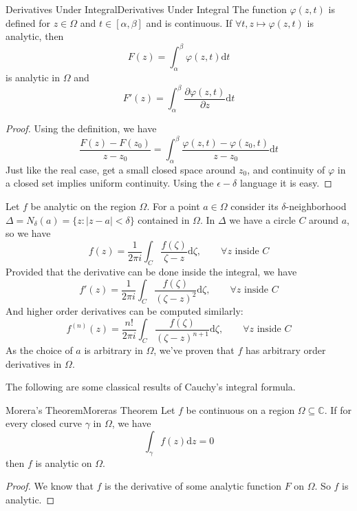 \documentclass[../main.tex]{subfiles}
\begin{document}
\begin{lemma}{Derivatives Under Integral}{Derivatives Under Integral}
	The function $\varphi(z,t)$ is defined for $z\in \Omega$ and $t\in [\alpha,\beta]$ and is continuous. If $\forall t, z \mapsto \varphi(z,t)$ is analytic, then
	\begin{equation}
	F(z) = \int_{\alpha}^{\beta} \varphi(z,t) \mathrm{d} t
	\end{equation}
	is analytic in $\Omega$ and
	\begin{equation}
	F'(z) = \int_{\alpha}^{\beta} \frac{\partial \varphi(z,t)}{\partial z}\mathrm{d} t
	\end{equation}
\end{lemma}
\begin{proof}
	Using the definition, we have
	\begin{equation*}
	\frac{F(z)-F(z_0)}{z-z_0} = \int_{\alpha}^{\beta} \frac{\varphi(z,t)-\varphi(z_0,t)}{z-z_0} \mathrm{d} t
	\end{equation*}
	Just like the real case, get a small closed space around $z_0$, and continuity of $\varphi$ in a closed set implies uniform continuity. Using the $\epsilon-\delta$ language it is easy.
\end{proof}

Let $f$ be analytic on the region $\Omega$. For a point $a\in \Omega$ consider its $\delta$-neighborhood $\Delta = N_\delta(a) = \{ z: |z-a|<\delta \}$ contained in $\Omega$.  In $\Delta$ we have a circle $C$ around $a$, so we have
\begin{equation*}
	f(z) = \frac{1}{2 \pi i} \int_C \frac{f(\zeta)}{\zeta - z} \mathrm{d} \zeta, \qquad \forall z \text{ inside }C
\end{equation*}
Provided that the derivative can be done inside the integral, we have
\begin{equation}
	f'(z) = \frac{1}{2 \pi i} \int_C \frac{f(\zeta)}{(\zeta - z)^2} \mathrm{d} \zeta, \qquad \forall z \text{ inside }C
\end{equation}
And higher order derivatives can be computed similarly:
\begin{equation}\label{eq:Cauchy's Integral Formula for Derivatives}
	f^{(n)}(z) = \frac{n!}{2 \pi i} \int_C \frac{f(\zeta)}{(\zeta - z)^{n+1}} \mathrm{d} \zeta, \qquad \forall z \text{ inside }C
\end{equation}
As the choice of $a$ is arbitrary in $\Omega$, we've proven that $f$ has arbitrary order derivatives in $\Omega$.

The following are some classical results of Cauchy's integral formula.
\begin{theorem}{Morera's Theorem}{Moreras Theorem}
	Let $f$ be continuous on a region $\Omega \subseteq \mathbb{C}$. If for every closed curve $\gamma$ in $\Omega$, we have
	\begin{equation}
		\int_{\gamma} f(z) \mathrm{d} z = 0
	\end{equation}
	then $f$ is analytic on $\Omega$.
\end{theorem}
\begin{proof}
We know that $f$ is the derivative of some analytic function $F$ on $\Omega$. So $f$ is analytic.
\end{proof}
\end{document}
